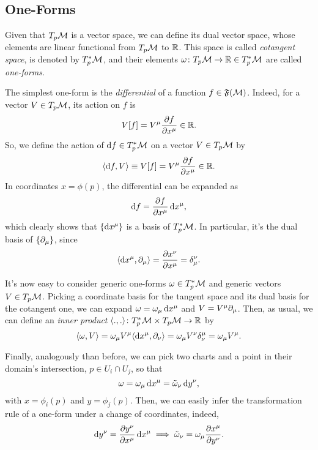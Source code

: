 \subsection{One-Forms}
Given that $T_p \mathcal{M}$ is a vector space, we can define its dual vector space, whose elements are linear functional from $T_p \mathcal{M}$ to $\mathbb{R}$. This space is called \emph{cotangent space}, is denoted by $T^*_p \mathcal{M}$, and their elements $\omega \colon T_p \mathcal{M} \to \mathbb{R} \in T^*_p \mathcal{M}$ are called \emph{one-forms}.

The simplest one-form is the \emph{differential} of a function $f \in \mathfrak{F}(\mathcal{M})$. Indeed, for a vector $V \in T_p \mathcal{M}$, its action on $f$ is
\begin{equation}
    V[f] = V^\mu \frac{\partial f}{\partial x^\mu} \in \mathbb{R}.
\end{equation}
So, we define the action of $\mathop{}\!\mathrm{d} f \in T^*_p \mathcal{M}$ on a vector $V \in T_p \mathcal{M}$ by
\begin{equation}
    \langle \mathop{}\!\mathrm{d} f, V \rangle \equiv V[f] = V^\mu \frac{\partial f}{\partial x^\mu} \in \mathbb{R}.
\end{equation}
In coordinates $x = \phi(p)$, the differential can be expanded as
\begin{equation}
    \mathop{}\!\mathrm{d} f = \frac{\partial f}{\partial x^\mu} \mathop{}\!\mathrm{d} x^\mu,
\end{equation}
which clearly shows that $\{ \mathop{}\!\mathrm{d} x^\mu \}$ is a basis of $T^*_p \mathcal{M}$. In particular, it's the dual basis of $\{ \partial_\mu \}$, since
\begin{equation}
    \langle \mathop{}\!\mathrm{d} x^\mu, \partial_\mu \rangle = \frac{\partial x^\nu}{\partial x^\mu} = \delta^\nu_\mu .
\end{equation}

It's now easy to consider generic one-forms $\omega \in T^*_p \mathcal{M}$ and generic vectors $V \in T_p \mathcal{M}$. Picking a coordinate basis for the tangent space and its dual basis for the cotangent one, we can expand $\omega = \omega_\mu \mathop{}\!\mathrm{d} x^\mu$ and $V = V^\mu \partial_\mu$. Then, as usual, we can define an \emph{inner product} $\langle ., . \rangle\colon T^*_p \mathcal{M} \times T_p \mathcal{M} \to \mathbb{R}$ by
\begin{equation}\label{eq:def-inner-product-vector-one-form}
    \langle \omega, V \rangle = \omega_\mu V^\mu \langle \mathop{}\!\mathrm{d} x^\mu, \partial_\nu \rangle = \omega_\mu V^\nu \delta^\mu_\nu = \omega_\mu V^\mu.
\end{equation}

Finally, analogously than before, we can pick two charts and a point in their domain's intersection, $p \in U_i \cap U_j$, so that
\begin{equation}
    \omega = \omega_\mu \mathop{}\!\mathrm{d} x^\mu = \tilde{\omega}_\nu \mathop{}\!\mathrm{d} y^\nu,
\end{equation}
with $x = \phi_i(p)$ and $y=\phi_j(p)$. Then, we can easily infer the transformation rule of a one-form under a change of coordinates, indeed,
\begin{equation}
    \mathop{}\!\mathrm{d} y^\nu = \frac{\partial y^\nu}{\partial x^\mu} \mathop{}\!\mathrm{d} x^\mu \implies \tilde{\omega}_\nu = \omega_\mu \frac{\partial x^\mu}{\partial y^\nu} .
\end{equation}

